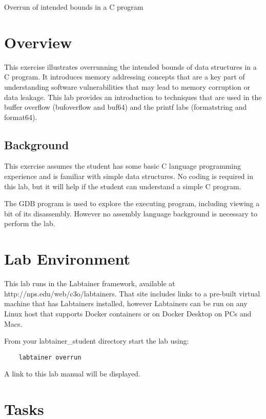 


\begin{center}
{\LARGE Overrun of intended bounds in a C program}
\vspace{0.1in}\\
\end{center}


\section{Overview}
This exercise illustrates overrunning the intended bounds of
data structures in a C program.   It introduces memory 
addressing concepts that are a key part of understanding software
vulnerabilities that may lead to memory corruption or data leakage.
This lab provides an introduction to techniques that are used
in the buffer overflow (bufoverflow and buf64) and the printf labs
(formatstring and format64).

\subsection{Background}
This exercise assumes the student has some basic C language programming
experience and is familiar with simple data structures.
No coding is required in this lab, but it will help if the student
can understand a simple C program.

The GDB program is used to explore the executing program, including viewing
a bit of its disassembly.  However no assembly language background is necessary to perform
the lab.

\section{Lab Environment}
This lab runs in the Labtainer framework,
available at http://nps.edu/web/c3o/labtainers.
That site includes links to a pre-built virtual machine
that has Labtainers installed, however Labtainers can
be run on any Linux host that supports Docker containers
or on Docker Desktop on PCs and Macs.

From your labtainer_student directory start the lab using:
\begin{verbatim}
    labtainer overrun
\end{verbatim}
A link to this lab manual will be displayed.


\section{Tasks}


